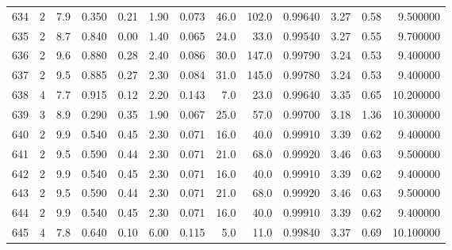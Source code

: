\begin{tabular}{lrrrrrrrrrrrr}
634  &        2 &            7.9 &             0.350 &         0.21 &            1.90 &      0.073 &                 46.0 &                 102.0 &  0.99640 &  3.27 &       0.58 &   9.500000 \\
635  &        2 &            8.7 &             0.840 &         0.00 &            1.40 &      0.065 &                 24.0 &                  33.0 &  0.99540 &  3.27 &       0.55 &   9.700000 \\
636  &        2 &            9.6 &             0.880 &         0.28 &            2.40 &      0.086 &                 30.0 &                 147.0 &  0.99790 &  3.24 &       0.53 &   9.400000 \\
637  &        2 &            9.5 &             0.885 &         0.27 &            2.30 &      0.084 &                 31.0 &                 145.0 &  0.99780 &  3.24 &       0.53 &   9.400000 \\
638  &        4 &            7.7 &             0.915 &         0.12 &            2.20 &      0.143 &                  7.0 &                  23.0 &  0.99640 &  3.35 &       0.65 &  10.200000 \\
639  &        3 &            8.9 &             0.290 &         0.35 &            1.90 &      0.067 &                 25.0 &                  57.0 &  0.99700 &  3.18 &       1.36 &  10.300000 \\
640  &        2 &            9.9 &             0.540 &         0.45 &            2.30 &      0.071 &                 16.0 &                  40.0 &  0.99910 &  3.39 &       0.62 &   9.400000 \\
641  &        2 &            9.5 &             0.590 &         0.44 &            2.30 &      0.071 &                 21.0 &                  68.0 &  0.99920 &  3.46 &       0.63 &   9.500000 \\
642  &        2 &            9.9 &             0.540 &         0.45 &            2.30 &      0.071 &                 16.0 &                  40.0 &  0.99910 &  3.39 &       0.62 &   9.400000 \\
643  &        2 &            9.5 &             0.590 &         0.44 &            2.30 &      0.071 &                 21.0 &                  68.0 &  0.99920 &  3.46 &       0.63 &   9.500000 \\
644  &        2 &            9.9 &             0.540 &         0.45 &            2.30 &      0.071 &                 16.0 &                  40.0 &  0.99910 &  3.39 &       0.62 &   9.400000 \\
645  &        4 &            7.8 &             0.640 &         0.10 &            6.00 &      0.115 &                  5.0 &                  11.0 &  0.99840 &  3.37 &       0.69 &  10.100000 \\

\end{tabular}
